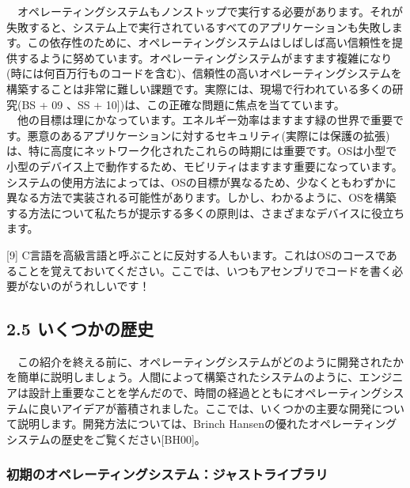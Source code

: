 　オペレーティングシステムもノンストップで実行する必要があります。それが失敗すると、システム上で実行されているすべてのアプリケーションも失敗します。この依存性のために、オペレーティングシステムはしばしば高い信頼性を提供するように努めています。オペレーティングシステムがますます複雑になり(時には何百万行ものコードを含む)、信頼性の高いオペレーティングシステムを構築することは非常に難しい課題です。実際には、現場で行われている多くの研究(BS
+ 09 、SS + 10{]})は、この正確な問題に焦点を当てています。\\
　他の目標は理にかなっています。エネルギー効率はますます緑の世界で重要です。悪意のあるアプリケーションに対するセキュリティ(実際には保護の拡張)は、特に高度にネットワーク化されたこれらの時期には重要です。OSは小型で小型のデバイス上で動作するため、モビリティはますます重要になっています。システムの使用方法によっては、OSの目標が異なるため、少なくともわずかに異なる方法で実装される可能性があります。しかし、わかるように、OSを構築する方法について私たちが提示する多くの原則は、さまざまなデバイスに役立ちます。

{[}9{]}
C言語を高級言語と呼ぶことに反対する人もいます。これはOSのコースであることを覚えておいてください。ここでは、いつもアセンブリでコードを書く必要がないのがうれしいです！

\hypertarget{ux3044ux304fux3064ux304bux306eux6b74ux53f2}{%
\subsection*{2.5
いくつかの歴史}\label{ux3044ux304fux3064ux304bux306eux6b74ux53f2}}

　この紹介を終える前に、オペレーティングシステムがどのように開発されたかを簡単に説明しましょう。人間によって構築されたシステムのように、エンジニアは設計上重要なことを学んだので、時間の経過とともにオペレーティングシステムに良いアイデアが蓄積されました。ここでは、いくつかの主要な開発について説明します。開発方法については、Brinch
Hansenの優れたオペレーティングシステムの歴史をご覧ください{[}BH00{]}。

\hypertarget{ux521dux671fux306eux30aaux30daux30ecux30fcux30c6ux30a3ux30f3ux30b0ux30b7ux30b9ux30c6ux30e0ux30b8ux30e3ux30b9ux30c8ux30e9ux30a4ux30d6ux30e9ux30ea}{%
\subsubsection*{初期のオペレーティングシステム：ジャストライブラリ}\label{ux521dux671fux306eux30aaux30daux30ecux30fcux30c6ux30a3ux30f3ux30b0ux30b7ux30b9ux30c6ux30e0ux30b8ux30e3ux30b9ux30c8ux30e9ux30a4ux30d6ux30e9ux30ea}}

